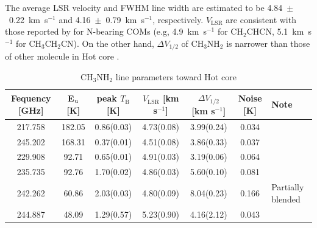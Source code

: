The average LSR velocity and FWHM line width are estimated to be 4.84~$\pm$~0.22~km~s$^{-1}$ and 
4.16~$\pm$~0.79~km~s$^{-1}$, respectively.
 $V_{\mathrm{LSR}}$ are consistent with those reported by \citet{Feng+2015} for N-bearing COMs
 (e.g, 4.9~km~s$^{-1}$ for CH$_2$CHCN, 5.1~km~s$^{-1}$ for CH$_3$CH$_2$CN).
On the other hand, $\Delta V_{1/2}$ of CH$_3$NH$_2$ is narrower than those of other molecule in Hot core
\citep[tipically 5--15~km~s$^{-1}$,][]{Pagani+2017}.

\renewcommand{\arraystretch}{1.5}
\begin{table}[htb]
\begin{center}

  \caption{CH$_3$NH$_2$ line parameters toward Hot core}
  \label{tab:paraOri}
{\scriptsize
  \begin{tabular}{ccccccl} \hline
   Fequency [GHz]& E$_{\rm{u}}$ [K] &  peak $T_{\mathrm{B}}$ [K] & $V_{\mathrm{LSR}}$ [km s$^{-1}$] & $\Delta V_{1/2}$ [km s$^{-1}$] & Noise [K]  & Note \\ \hline 
    217.758  & 182.05 &  0.86(0.03) & 4.73(0.08) & 3.99(0.24) & 0.034 & \\
    245.202 & 168.31 & 0.37(0.01) & 4.51(0.08) & 3.86(0.33) & 0.037 & \\
    229.908  & 92.71 &  0.65(0.01) & 4.91(0.03) & 3.19(0.06)& 0.064&\\ 
    235.735  & 92.76 & 1.70(0.02) & 4.86(0.03) & 5.60(0.10)& 0.081 & \\
    242.262  & 60.86 &  2.03(0.03) & 4.80(0.09) & 8.04(0.23) & 0.166 & Partially blended \\
    244.887  & 48.09 & 1.29(0.57)& 5.23(0.90) & 4.16(2.12) & 0.043 & \\ \hline
  \end{tabular}
  }
\end{center}
\end{table}


